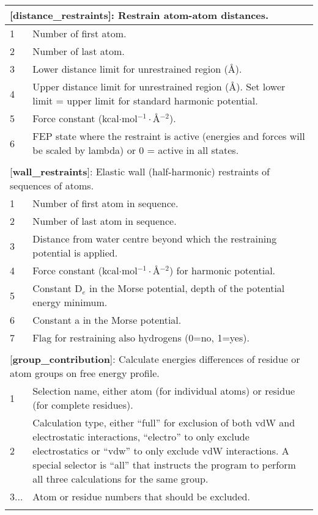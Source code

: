 \documentclass[a4paper,11pt]{article}
\begin{document}
\begin{longtable}{|p{78pt}|p{158pt}|p{158pt}|}
\multicolumn{3}{p{394pt}}{[\textbf{distance\_restraints}]: Restrain atom-atom distances.}\\
\hline 1 & \multicolumn{2}{p{320pt}|}{  Number of first atom.}\\
\hline 2 & \multicolumn{2}{p{320pt}|}{  Number of last atom.}\\
\hline 3 & \multicolumn{2}{p{320pt}|}{  Lower distance limit for unrestrained region ({\AA}).}\\
\hline 4 & \multicolumn{2}{p{320pt}|}{  Upper distance limit for unrestrained region ({\AA}). Set lower limit = upper limit for standard harmonic potential.}\\
\hline 5 & \multicolumn{2}{p{320pt}|}{  Force constant (kcal$\cdot$mol$^{-1}\cdot${\AA}$^{-2}$).}\\
\hline 6 & \multicolumn{2}{p{320pt}|}{  FEP state where the restraint is active (energies and forces will be scaled by lambda) or 0 = active in all states.}\\
\hline
\multicolumn{3}{p{394pt}}{}\\

\multicolumn{3}{p{394pt}}{[\textbf{wall\_restraints}]: Elastic wall (half-harmonic) restraints of sequences of atoms.}\\
\hline 1 & \multicolumn{2}{p{320pt}|}{  Number of first atom in sequence.}\\
\hline 2 & \multicolumn{2}{p{320pt}|}{  Number of last atom in sequence.}\\
\hline 3 & \multicolumn{2}{p{320pt}|}{  Distance from water centre beyond which the restraining potential is applied.}\\
\hline 4 & \multicolumn{2}{p{320pt}|}{  Force constant (kcal$\cdot$mol$^{-1}\cdot${\AA}$^{-2}$) for harmonic potential.}\\
\hline 5 & \multicolumn{2}{p{320pt}|}{  Constant D$_{e}$ in the Morse potential, depth of the potential energy minimum.}\\
\hline 6 & \multicolumn{2}{p{320pt}|}{  Constant a in the Morse potential.}\\
\hline 7 & \multicolumn{2}{p{320pt}|}{  Flag for restraining also hydrogens (0=no, 1=yes).}\\
\hline
\multicolumn{3}{p{394pt}}{}\\
\multicolumn{3}{p{394pt}}{[\textbf{group{\_}contribution}]: Calculate energies differences of residue or atom groups on free energy profile.}\\
\hline 1 & \multicolumn{2}{p{320pt}|}{ Selection name, either atom (for individual atoms) or residue (for complete residues).} \\
\hline 2 & \multicolumn{2}{p{320pt}|}{ Calculation type, either ``full'' for exclusion of both vdW and electrostatic interactions, ``electro'' to only exclude electrostatics or ``vdw'' to only exclude vdW interactions. A special selector is ``all'' that instructs the program to perform all three calculations for the same group.}\\
\hline 3... & \multicolumn{2}{p{320pt}|}{Atom or residue numbers that should be excluded.} \\ 
\hline
\multicolumn{3}{p{394pt}}{}\\



\end{longtable}
\end{document}
